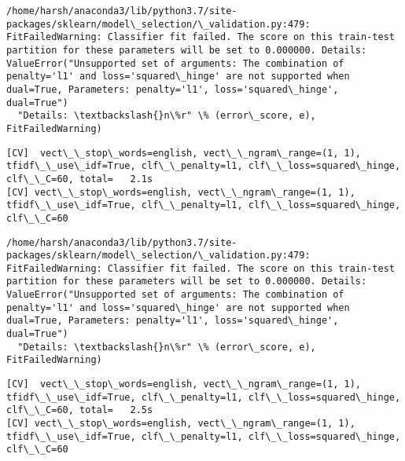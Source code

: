 \documentclass[11pt]{article}
\begin{document}
    \begin{Verbatim}[commandchars=\\\{\}]
/home/harsh/anaconda3/lib/python3.7/site-packages/sklearn/model\_selection/\_validation.py:479: FitFailedWarning: Classifier fit failed. The score on this train-test partition for these parameters will be set to 0.000000. Details: 
ValueError("Unsupported set of arguments: The combination of penalty='l1' and loss='squared\_hinge' are not supported when dual=True, Parameters: penalty='l1', loss='squared\_hinge', dual=True")
  "Details: \textbackslash{}n\%r" \% (error\_score, e), FitFailedWarning)

    \end{Verbatim}

    \begin{Verbatim}[commandchars=\\\{\}]
[CV]  vect\_\_stop\_words=english, vect\_\_ngram\_range=(1, 1), tfidf\_\_use\_idf=True, clf\_\_penalty=l1, clf\_\_loss=squared\_hinge, clf\_\_C=60, total=   2.1s
[CV] vect\_\_stop\_words=english, vect\_\_ngram\_range=(1, 1), tfidf\_\_use\_idf=True, clf\_\_penalty=l1, clf\_\_loss=squared\_hinge, clf\_\_C=60 

    \end{Verbatim}

    \begin{Verbatim}[commandchars=\\\{\}]
/home/harsh/anaconda3/lib/python3.7/site-packages/sklearn/model\_selection/\_validation.py:479: FitFailedWarning: Classifier fit failed. The score on this train-test partition for these parameters will be set to 0.000000. Details: 
ValueError("Unsupported set of arguments: The combination of penalty='l1' and loss='squared\_hinge' are not supported when dual=True, Parameters: penalty='l1', loss='squared\_hinge', dual=True")
  "Details: \textbackslash{}n\%r" \% (error\_score, e), FitFailedWarning)

    \end{Verbatim}

    \begin{Verbatim}[commandchars=\\\{\}]
[CV]  vect\_\_stop\_words=english, vect\_\_ngram\_range=(1, 1), tfidf\_\_use\_idf=True, clf\_\_penalty=l1, clf\_\_loss=squared\_hinge, clf\_\_C=60, total=   2.5s
[CV] vect\_\_stop\_words=english, vect\_\_ngram\_range=(1, 1), tfidf\_\_use\_idf=True, clf\_\_penalty=l1, clf\_\_loss=squared\_hinge, clf\_\_C=60 

    \end{Verbatim}
\end{document}
